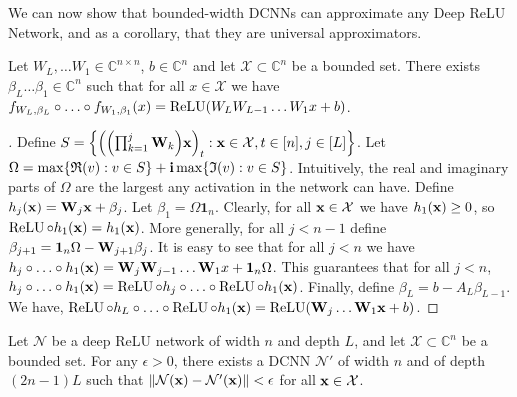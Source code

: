 We can now show that bounded-width DCNNs can approximate any Deep ReLU Network, and as a corollary, that they are universal approximators.

\begin{lemma} \label{lemma:product_of_mat_to_DNN}
Let $W_{L},\ldots W_{1}\in\mathbb{C}^{n\times n}$, $b\in\mathbb{C}^{n}$ and let $\mathcal{X}\subset\mathbb{C}^{n}$ be a bounded set.
There exists $\beta_{L} \ldots \beta_{1} \in \mathbb{C}^{n}$ such that for all $x \in \mathcal{X}$ we have $f_{W_{L},\beta_{L}} \circ \ldots \circ f_{W_{1},\beta_{1}}(x) = \relu \left(W_{L}W_{L-1} \ldots W_{1}x+b \right)$.
\end{lemma}

\begin{proof}[]
Define $S = \left\{ \left(\left(\prod_{k=1}^{j} \Wmat_{k} \right) \xvec \right)_{t}: \xvec \in \mathcal{X}, t \in [n], j \in [L] \right\}$.
Let $\Omega = \max\left\{ \mathfrak{R}(v): v \in S \right\} + \ci \max\left\{ \mathfrak{I}(v):v \in S \right\}$.
Intuitively, the real and imaginary parts of $\Omega$ are the largest any activation in the network can have.
Define $h_{j}(\mathbf{x}) = \mathbf{W}_{j}\mathbf{x} + \beta_{j}$. Let $\beta_{1} = \Omega \mathbf{1}_{n}$.
Clearly, for all $\mathbf{x} \in \mathcal{X}$ we have $h_{1}(\mathbf{x})\ge0$, so $\operatorname{ReLU} \circ h_{1}(\mathbf{x}) = h_{1}(\mathbf{x})$.
More generally, for all $j < n-1$ define $\beta_{j+1} = \mathbf{1}_{n} \Omega - \mathbf{W}_{j+1} \beta_{j}$.
It is easy to see that for all $j < n$ we have $h_{j} \circ \ldots \circ h_{1}(\mathbf{x}) = \mathbf{W}_{j}\mathbf{W}_{j-1} \ldots \mathbf{W}_{1}x + \mathbf{1}_{n} \Omega$.
This guarantees that for all $j < n$, $h_{j} \circ \ldots \circ h_{1}(\mathbf{x}) = \operatorname{ReLU} \circ h_{j} \circ \ldots \circ \operatorname{ReLU} \circ h_{1}(\mathbf{x})$.
Finally, define $\beta_{L} = b - A_{L} \beta_{L-1}$.
We have, $\relu \circ h_{L} \circ \ldots \circ \relu \circ h_{1}(\xvec) = \relu \left(\Wmat_{j} \ldots \Wmat_{1} \xvec + b \right)$. 
\end{proof}

\begin{lemma} \label{lemma:dcnn_approx_neural_network}
Let $\mathcal{N}$ be a deep ReLU network of width $n$ and depth $L$, and let $\mathcal{X} \subset \mathbb{C}^{n}$ be a bounded set.
For any $\epsilon > 0$, there exists a DCNN $\mathcal{N}'$ of width $n$ and of depth $(2n-1)L$ such that $\norm{\mathcal{N}(\mathbf{x}) - \mathcal{N}'(\mathbf{x})} < \epsilon$ for all $\mathbf{x} \in \mathcal{X}$.
\end{lemma}

